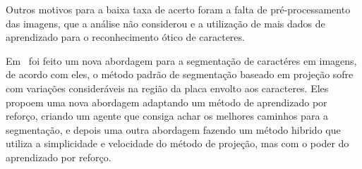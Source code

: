Outros motivos para a baixa taxa de acerto foram a falta de pré-processamento
das imagens, que a análise não considerou e a utilização de mais dados de
aprendizado para o reconhecimento ótico de caracteres.

Em~\cite{abtahi2015deep} foi feito um nova abordagem para a segmentação de
caractéres em imagens, de acordo com eles, o método padrão de segmentação
baseado em projeção sofre com variações consideráveis na região da placa envolto
aos caracteres. Eles propoem uma nova abordagem adaptando um método de
aprendizado por reforço, criando um agente que consiga achar os melhores
caminhos para a segmentação, e depois uma outra abordagem fazendo um método
hibrido que utiliza a simplicidade e velocidade do método de projeção, mas com o
poder do aprendizado por reforço.

